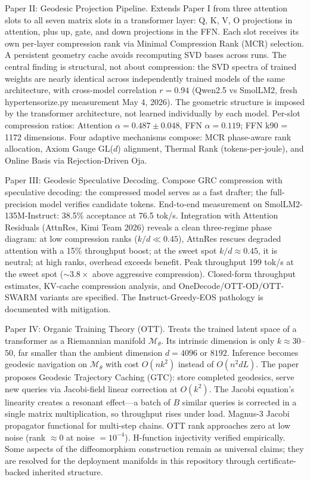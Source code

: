\documentclass[11pt]{article}
\begin{document}
Paper II: Geodesic Projection Pipeline. Extends Paper I from three attention slots to all seven matrix slots in a transformer layer: Q, K, V, O projections in attention, plus up, gate, and down projections in the FFN. Each slot receives its own per-layer compression rank via Minimal Compression Rank (MCR) selection. A persistent geometry cache avoids recomputing SVD bases across runs. The central finding is structural, not about compression: the SVD spectra of trained weights are nearly identical across independently trained models of the same architecture, with cross-model correlation $r = 0.94$ (Qwen2.5 vs SmolLM2, fresh hypertensorize.py measurement May 4, 2026). The geometric structure is imposed by the transformer architecture, not learned individually by each model. Per-slot compression ratios: Attention $\alpha = 0.487 \pm 0.048$, FFN $\alpha = 0.119$; FFN k90 = 1172 dimensions. Four adaptive mechanisms compose: MCR phase-aware rank allocation, Axiom Gauge GL($d$) alignment, Thermal Rank (tokens-per-joule), and Online Basis via Rejection-Driven Oja.

Paper III: Geodesic Speculative Decoding. Compose GRC compression with speculative decoding: the compressed model serves as a fast drafter; the full-precision model verifies candidate tokens. End-to-end measurement on SmolLM2-135M-Instruct: 38.5\% acceptance at 76.5 tok/s. Integration with Attention Residuals (AttnRes, Kimi Team 2026) reveals a clean three-regime phase diagram: at low compression ranks ($k/d \ll 0.45$), AttnRes rescues degraded attention with a 15\% throughput boost; at the sweet spot $k/d \approx 0.45$, it is neutral; at high ranks, overhead exceeds benefit. Peak throughput 199 tok/s at the sweet spot ($\sim 3.8\times$ above aggressive compression). Closed-form throughput estimates, KV-cache compression analysis, and OneDecode/OTT-OD/OTT-SWARM variants are specified. The Instruct-Greedy-EOS pathology is documented with mitigation.

Paper IV: Organic Training Theory (OTT). Treats the trained latent space of a transformer as a Riemannian manifold $\mathcal{M}_\theta$. Its intrinsic dimension is only $k \approx 30$--$50$, far smaller than the ambient dimension $d = 4096$ or $8192$. Inference becomes geodesic navigation on $\mathcal{M}_\theta$ with cost $O(n k^2)$ instead of $O(n^2 d L)$. The paper proposes Geodesic Trajectory Caching (GTC): store completed geodesics, serve new queries via Jacobi-field linear correction at $O(k^2)$. The Jacobi equation's linearity creates a resonant effect---a batch of $B$ similar queries is corrected in a single matrix multiplication, so throughput rises under load. Magnus-3 Jacobi propagator functional for multi-step chains. OTT rank approaches zero at low noise (rank $\approx 0$ at noise $= 10^{-4}$). H-function injectivity verified empirically. Some aspects of the diffeomorphism construction remain as universal claims; they are resolved for the deployment manifolds in this repository through certificate-backed inherited structure.
\end{document}
